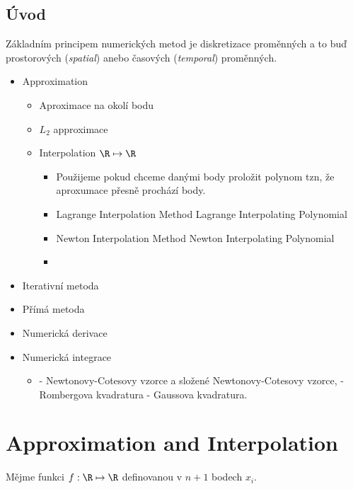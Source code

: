 \section{Úvod}
Základním principem numerických metod je diskretizace proměnných a to buď prostorových (\textit{spatial}) anebo časových (\textit{temporal}) proměnných.

\begin{itemize}
    \item Approximation
        \begin{itemize}
            \item Aproximace na okolí bodu
            \item $L_2$ approximace
            \item Interpolation $\R \mapsto \R$
            \begin{itemize}
                \item Použijeme pokud chceme danými body proložit polynom tzn, že aproxumace přesně prochází body.
                
                \item Lagrange Interpolation Method
                    Lagrange Interpolating Polynomial
                \item Newton Interpolation Method
                    Newton Interpolating Polynomial
                \item 
            \end{itemize}
        \end{itemize}
    \item Iterativní metoda
    
    \item Přímá metoda

    \item Numerická derivace
    \item Numerická integrace
        \begin{itemize}
            \item   - Newtonovy-Cotesovy vzorce a složené Newtonovy-Cotesovy vzorce,
  - Rombergova kvadratura
  - Gaussova kvadratura.
        \end{itemize}
\end{itemize}

\chapter{Approximation and Interpolation}

Mějme funkci $f: \R \mapsto \R$ definovanou v $n + 1$ bodech $x_i$.

